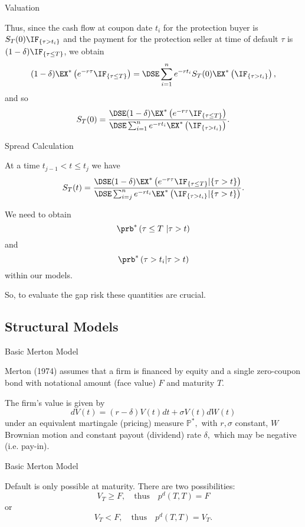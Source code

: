 


{Valuation}

Thus, since the cash flow at coupon date $t_i$ for the protection
buyer is $S_T(0)\IF_{\{\tau>t_i\}}$ and the payment for the protection
seller at time of default $\tau$ is $(1-\delta)\IF_{\{\tau\leq
T\}}$, we obtain
$$
(1-\delta)\EX^*\left(e^{-r\tau}\IF_{\{\tau\leq
T\}}\right) = \DSE\sum_{i=1}^n e^{-rt_i} S_T(0)\EX^*\left(\IF_{\{\tau
>t_i\}}\right),
$$
and so
$$
S_T(0)=\frac{\DSE (1-\delta)\EX^*\left(e^{-r\tau}\IF_{\{\tau\leq
T\}}\right)} {\DSE\sum_{i=1}^n e^{-rt_i} \EX^*\left(\IF_{\{\tau
>t_i\}}\right)}.
$$

{Spread Calculation}







	At a time $t_{j-1} < t \leq t_j$ we have
$$
S_T(t)=\frac{\DSE (1-\delta)\EX^*\left(e^{-r\tau}\IF_{\{\tau\leq
T\} }  | \{\tau >t\}\right)} {\DSE\sum_{i=j}^n e^{-rt_i} \EX^*\left(\IF_{\{\tau
>t_i\}}| \{\tau >t\}\right)}.
$$



	We need to obtain
$$\prb^*\left(\tau\leq T\ | \tau >t \right)$$ and
$$\prb^*\left(\tau >t_i | \tau >t\right)$$ within our models.


	So, to evaluate the gap risk these quantities are crucial.  %

\subsection{Structural Models}

{Basic Merton Model}

Merton (1974)
assumes that a firm is financed by
equity and a single zero-coupon bond with notational amount (face
value) $F$ and maturity $T$.

The firm's value is given by
$$
dV(t) = (r-\delta) V(t)  dt + \sigma V(t) dW(t)
$$
under an equivalent martingale (pricing) measure $\mathbb{P^*},$ with $r,
\sigma$ constant, $W$ Brownian motion and constant payout
(dividend) rate $\delta,$ which may be negative (i.e. pay-in).

{Basic Merton Model}

Default is only possible at maturity. There are two possibilities:
$$
V_T \geq F, \quad \mbox{thus} \quad p^d(T,T)=F
$$
or
$$
V_T < F, \quad \mbox{thus} \quad p^d(T,T)=V_T.
$$

